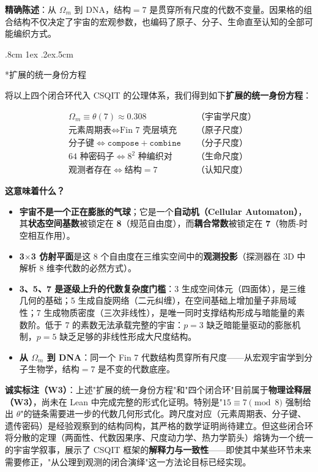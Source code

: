 \documentclass[aps,prd,twocolumn,nofootinbib,floatfix]{revtex4-2}
\makeatletter
\def\subsubsection{%
  \@startsection{subsubsection}{3}{\z@}
    {.8cm \@plus1ex \@minus .2ex}{.5cm}
    {\normalfont\normalsize\bfseries\itshape\raggedright}%
}
\makeatother
\begin{document}
\textbf{精确陈述}：从 $\Omega_m$ 到 DNA，结构$=7$ 是贯穿所有尺度的代数不变量。因果格的组合结构不仅决定了宇宙的宏观参数，也编码了原子、分子、生命直至认知的全部可能编织方式。

\subsubsection*{扩展的统一身份方程}

将以上四个闭合环代入 CSQIT 的公理体系，我们得到如下\textbf{扩展的统一身份方程}：

\[
\boxed{
\begin{aligned}
&\Omega_m \equiv \theta(7) \approx 0.308 \quad &\text{（宇宙学尺度）} \\
&\text{元素周期表} \iff \text{Fin 7 壳层填充} \quad &\text{（原子尺度）} \\
&\text{分子键} \iff \texttt{compose} + \texttt{combine} \quad &\text{（分子尺度）} \\
&64\text{ 种密码子} \iff 8^2\text{ 种编织对} \quad &\text{（生命尺度）} \\
&\text{观测者存在} \iff \text{结构}=7 \quad &\text{（认知尺度）}
\end{aligned}
}
\]

\textbf{这意味着什么？}
\begin{itemize}
    \item \textbf{宇宙不是一个正在膨胀的气球}；它是一个\textbf{自动机（Cellular Automaton）}，其\textbf{状态空间基数}被锁定在 \textbf{8}（规范自由度），而\textbf{耦合常数}被锁定在 \textbf{7}（物质-时空相互作用）。
    \item \textbf{3$\times$3 仿射平面}是这 8 个自由度在三维实空间中的\textbf{观测投影}（探测器在 3D 中解析 8 维李代数的必然方式）。
    \item \textbf{3、5、7 是逐级上升的代数复杂度门槛}：3 生成空间体元（四面体），是三维几何的基础；5 生成自旋网络（二元纠缠），在空间基础上增加量子非局域性；7 生成物质密度（三次非线性），是唯一同时支撑结构形成与暗能量的素数阶。低于 7 的素数无法承载完整的宇宙：$p=3$ 缺乏暗能量驱动的膨胀机制，$p=5$ 缺乏足够的非线性形成大尺度结构。
    \item \textbf{从 $\Omega_m$ 到 DNA}：同一个 Fin 7 代数结构贯穿所有尺度——从宏观宇宙学到分子生物学，结构$=7$ 是不变的代数底座。
\end{itemize}

\medskip
\noindent\textbf{诚实标注（W3）}：上述"扩展的统一身份方程"和"四个闭合环"目前属于\textbf{物理诠释层（W3）}，尚未在 Lean 中完成完整的形式化证明。特别是"$15 \equiv 7 \pmod 8$ 强制给出 $\theta$"的链条需要进一步的代数几何形式化。跨尺度对应（元素周期表、分子键、遗传密码）是经验观察到的结构同构，其严格的数学证明尚待建立。但这些闭合环将分散的定理（两面性、代数因果序、尺度动力学、热力学箭头）熔铸为一个统一的宇宙学叙事，展示了 CSQIT 框架的\textbf{解释力与一致性}——即使其中某些环节未来需要修正，"从公理到观测的闭合演绎"这一方法论目标已经实现。
\end{document}
